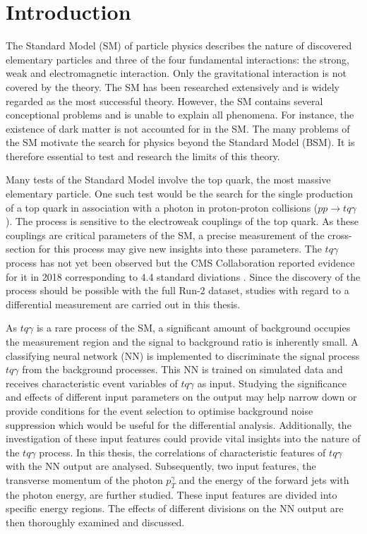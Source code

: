 \chapter{Introduction}


The Standard Model (SM) of particle physics  describes the nature of discovered elementary particles and three of the four fundamental interactions: the strong, weak and electromagnetic interaction. Only the gravitational interaction is not covered by the theory. The SM has been researched extensively and is widely regarded as the most successful theory. 
However, the SM contains several conceptional problems and is unable to explain all phenomena. For instance, the existence of dark matter is not accounted for in the SM. The many problems of the SM motivate the search for physics beyond the Standard Model (BSM). 
It is therefore essential to test and research the limits of this theory.

Many tests of the Standard Model involve the top quark, the most massive elementary particle. One such test would be the search for the single production of a top quark in association with a photon in proton-proton collisions ($pp \rightarrow tq\gamma$). 
The process is sensitive to the electroweak couplings of the top quark. As these couplings are critical parameters of the SM, a precise measurement of the cross-section for this process may give new insights into these parameters. 
The $tq\gamma$ process has not yet been observed but the CMS Collaboration reported evidence for it in 2018 corresponding to 4.4 standard diviations \cite{PhysRevLett.121.221802}. Since the discovery of the process should be possible with the full Run-2 dataset, studies with regard to a differential measurement are carried out in this thesis.

As $tq\gamma$ is a rare process of the SM, a significant amount of background occupies the measurement region and the signal to background ratio is inherently small. A classifying neural network (NN) is implemented to discriminate the signal process $tq\gamma$ from the background processes. 
This NN is trained on simulated data and receives characteristic event variables of $tq\gamma$ as input. 
Studying the significance and effects of different input parameters on the output may help narrow down or provide conditions for the event selection to optimise background noise suppression which would be useful for the differential analysis. Additionally, the investigation of these input features could provide vital insights into the nature of the $tq\gamma$ process. 
In this thesis, the correlations of characteristic features of $tq\gamma$ with the NN output are analysed. 
Subsequently, two input features, the transverse momentum of the photon $p_T^\gamma$ and the energy of the forward jets with the photon energy, are further studied. 
These input features are divided into specific energy regions. The effects of different divisions on the NN output are then thoroughly examined and discussed. 

